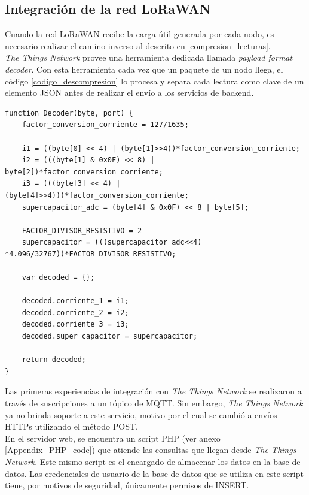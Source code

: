 \subsection{Integraci\'{o}n de la red LoRaWAN}
\label{seccion_lorawan}
Cuando la red LoRaWAN recibe la carga útil generada por cada nodo, es necesario realizar el camino inverso al descrito en \ref{compresion_lecturas}.\\
\textit{The Things Network} provee una herramienta dedicada llamada \textit{payload format decoder}. Con esta herramienta cada vez que un paquete de un nodo llega, el código \ref{codigo_descompresion} lo procesa y separa cada lectura como clave de un elemento JSON antes de realizar el env\'{i}o a los servicios de backend.\\
\begin{lstlisting}[label=codigo_descompresion,caption=Función encargada de descomprimir las 4 lecturas de 12 bits.]
function Decoder(byte, port) {
	factor_conversion_corriente = 127/1635;
	
	i1 = ((byte[0] << 4) | (byte[1]>>4))*factor_conversion_corriente;
	i2 = (((byte[1] & 0x0F) << 8) | byte[2])*factor_conversion_corriente;
	i3 = (((byte[3] << 4) | (byte[4]>>4)))*factor_conversion_corriente;
	supercapacitor_adc = (byte[4] & 0x0F) << 8 | byte[5];
	
	FACTOR_DIVISOR_RESISTIVO = 2
	supercapacitor = (((supercapacitor_adc<<4) *4.096/32767))*FACTOR_DIVISOR_RESISTIVO;	
	
	var decoded = {};

	decoded.corriente_1 = i1;
	decoded.corriente_2 = i2;
	decoded.corriente_3 = i3;
	decoded.super_capacitor = supercapacitor;

	return decoded;  
}   

\end{lstlisting}
Las primeras experiencias de integración con \textit{The Things Network} se realizaron a través de suscripciones a un tópico de MQTT. Sin embargo, \textit{The Things Network} ya no brinda soporte a este servicio, motivo por el cual se cambió a envíos HTTPs utilizando el método POST.\\
En el servidor web, se encuentra un script PHP (ver anexo \ref{Appendix_PHP_code}) que atiende las consultas que llegan desde \textit{The Things Network}. Este mismo script es el encargado de almacenar los datos en la base de datos. Las credenciales de usuario de la base de datos que se utiliza en este script tiene, por motivos de seguridad, \'{u}nicamente permisos de INSERT.\\

